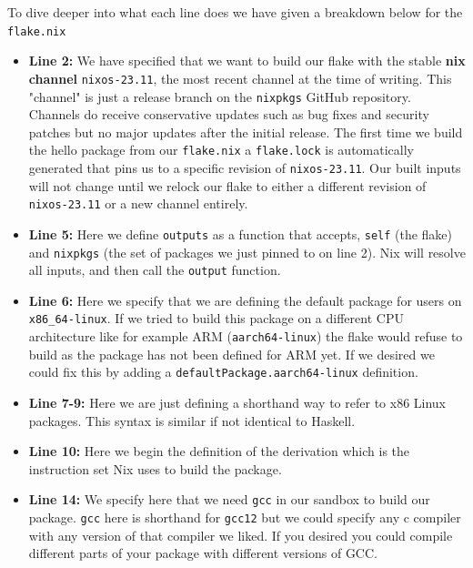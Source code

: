 To dive deeper into what each line does we have given a breakdown below for the \texttt{flake.nix} \\
{ \small
\begin{itemize}
  \item \textbf{Line 2:} We have specified that we want to build our flake with the stable \textbf{nix channel} \texttt{nixos-23.11}, the most recent channel at the time of writing. This "channel" is just a release branch on the \texttt{nixpkgs} GitHub repository. Channels do receive conservative updates such as bug fixes and security patches but no major updates after the initial release. The first time we build the hello package from our \texttt{flake.nix} a \texttt{flake.lock} is automatically generated that pins us to a specific revision of \texttt{nixos-23.11}. Our built inputs will not change until we relock our flake to either a different revision of \texttt{nixos-23.11} or a new channel entirely. 

  \item \textbf{Line 5:} Here we define \texttt{outputs} as a function that accepts, \texttt{self} (the flake) and \texttt{nixpkgs} (the set of packages we just pinned to on line 2). Nix will resolve all inputs, and then call the \texttt{output} function.
  
  \item \textbf{Line 6:} Here we specify that we are defining the default package for users on \texttt{x86\_64-linux}. If we tried to build this package on a different CPU architecture like for example ARM (\texttt{aarch64-linux}) the flake would refuse to build as the package has not been defined for ARM yet. If we desired we could fix this by adding a \texttt{defaultPackage.aarch64-linux} definition.

  \item \textbf{Line 7-9:} Here we are just defining a shorthand way to refer to x86 Linux packages. This syntax is similar if not identical to Haskell.

  \item \textbf{Line 10:} Here we begin the definition of the derivation which is the instruction set Nix uses to build the package.
  
  \item \textbf{Line 14:} We specify here that we need \texttt{gcc} in our sandbox to build our package. \texttt{gcc} here is shorthand for \texttt{gcc12} but we could specify any c compiler with any version of that compiler we liked. If you desired you could compile different parts of your package with different versions of GCC.


\end{itemize}}
